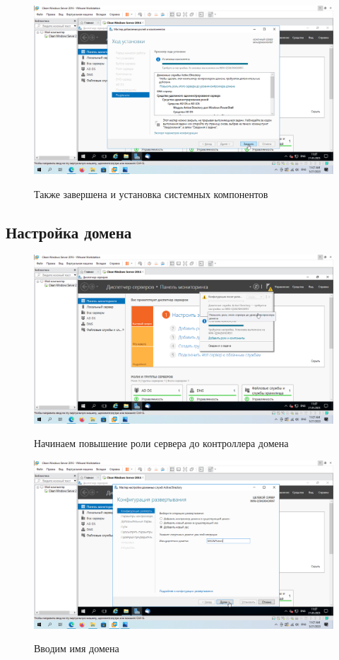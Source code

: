 \documentclass[a4paper]{article}
\begin{document}
  \begin{figure}[H]
    \centering
    \includegraphics[width=\textwidth]{11_0034}
    \label{img:34}
    \caption{Также завершена и установка системных компонентов}
  \end{figure}

  \subsection{Настройка домена}

  \begin{figure}[H]
    \centering
    \includegraphics[width=\textwidth]{11_0035}
    \label{img:35}
    \caption{Начинаем повышение роли сервера до контроллера домена}
  \end{figure}

  \begin{figure}[H]
    \centering
    \includegraphics[width=\textwidth]{11_0036}
    \label{img:36}
    \caption{Вводим имя домена}
  \end{figure}
\end{document}
